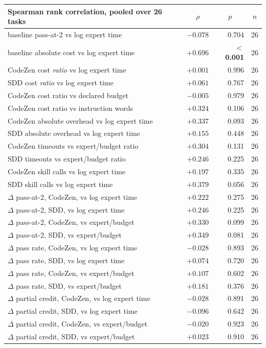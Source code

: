 
\begin{tabular}{@{}lrrr@{}}
\toprule
Spearman rank correlation, pooled over 26 tasks & \multicolumn{1}{c}{$\rho$} & \multicolumn{1}{c}{$p$} & \multicolumn{1}{c}{$n$} \\
\midrule
baseline pass-at-2 vs log expert time & $-0.078$ & 0.704 & 26 \\
baseline absolute cost vs log expert time & $+0.696$ & \textbf{$<$0.001} & 26 \\
CodeZen cost \emph{ratio} vs log expert time & $+0.001$ & 0.996 & 26 \\
SDD cost \emph{ratio} vs log expert time & $+0.061$ & 0.767 & 26 \\
CodeZen cost ratio vs declared budget & $-0.005$ & 0.979 & 26 \\
CodeZen cost ratio vs instruction words & $+0.324$ & 0.106 & 26 \\
CodeZen absolute overhead vs log expert time & $+0.337$ & 0.093 & 26 \\
SDD absolute overhead vs log expert time & $+0.155$ & 0.448 & 26 \\
CodeZen timeouts vs expert/budget ratio & $+0.304$ & 0.131 & 26 \\
SDD timeouts vs expert/budget ratio & $+0.246$ & 0.225 & 26 \\
CodeZen skill calls vs log expert time & $+0.197$ & 0.335 & 26 \\
SDD skill calls vs log expert time & $+0.379$ & 0.056 & 26 \\
$\Delta$ pass-at-2, CodeZen, vs log expert time & $+0.222$ & 0.275 & 26 \\
$\Delta$ pass-at-2, SDD, vs log expert time & $+0.246$ & 0.225 & 26 \\
$\Delta$ pass-at-2, CodeZen, vs expert/budget & $+0.330$ & 0.099 & 26 \\
$\Delta$ pass-at-2, SDD, vs expert/budget & $+0.349$ & 0.081 & 26 \\
$\Delta$ pass rate, CodeZen, vs log expert time & $-0.028$ & 0.893 & 26 \\
$\Delta$ pass rate, SDD, vs log expert time & $+0.074$ & 0.720 & 26 \\
$\Delta$ pass rate, CodeZen, vs expert/budget & $+0.107$ & 0.602 & 26 \\
$\Delta$ pass rate, SDD, vs expert/budget & $+0.181$ & 0.376 & 26 \\
$\Delta$ partial credit, CodeZen, vs log expert time & $-0.028$ & 0.891 & 26 \\
$\Delta$ partial credit, SDD, vs log expert time & $-0.096$ & 0.642 & 26 \\
$\Delta$ partial credit, CodeZen, vs expert/budget & $-0.020$ & 0.923 & 26 \\
$\Delta$ partial credit, SDD, vs expert/budget & $+0.023$ & 0.910 & 26 \\
\bottomrule
\end{tabular}

